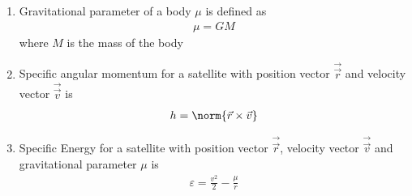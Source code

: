 \begin{enumerate}[label=\thesubsection.\arabic*, ref=\thesubsection.\theenumi]
\begin{align}
r^2 \brak{\vec{r}\brak{\theta}^{\top}\vec{V}\vec{r}\brak{\theta}} + 2r \brak{\vec{u}^{\top}\vec{r}\brak{\theta}} + f = 0
\label{eq:EE26BTECH11202-polar_quad}
\end{align}
Evaluating the inner products:
\begin{align}
\vec{n}^{\top}\vec{r}\brak{\theta} &= \myvec{\cos\theta_0 & \sin\theta_0}\myvec{\cos\theta \\ \sin\theta} = \cos\brak{\theta - \theta_0}
\\
\vec{r}\brak{\theta}^{\top}\vec{V}\vec{r}\brak{\theta} &= \vec{r}\brak{\theta}^{\top}\brak{\vec{I} - e^2\vec{n}\vec{n}^{\top}}\vec{r}\brak{\theta} = 1 - e^2 \cos^2\brak{\theta - \theta_0}
\\
\vec{u}^{\top}\vec{r}\brak{\theta} &= -p e^2 \cos\brak{\theta - \theta_0}
\end{align}
Substituting these into \eqref{eq:EE26BTECH11202-polar_quad}:
\begin{align}
r^2 \sbrak{1 - e^2 \cos^2\brak{\theta - \theta_0}} - 2r p e^2 \cos\brak{\theta - \theta_0} - p^2 e^2 = 0
\end{align}
Factoring the quadratic expression:
\begin{align}
\sbrak{r\brak{1 + e\cos\brak{\theta - \theta_0}} - ep} \sbrak{r\brak{1 - e\cos\brak{\theta - \theta_0}} + ep} = 0
\end{align}
Taking the positive real root for radial distance $r > 0$:
\begin{align}
r\brak{1 + e\cos\brak{\theta - \theta_0}} = ep
\end{align}
yielding \eqref{eq:EE26BTECH11202-polar_conic}
\item Gravitational parameter of a body $\mu$ is defined as
\begin{align}
	\mu=GM
\end{align}
where $M$ is the mass of the body
\item Specific angular momentum for a satellite with position vector $\vec{\vec{r}}$ and velocity vector $\vec{\vec{v}}$ is 
\begin{align}
	h= \norm{\vec{r} \times \vec{v}} \label{eq:EE26BTECH11202-ang-moment}
\end{align}
\item Specific Energy for a satellite with position vector $\vec{\vec{r}}$, velocity vector $\vec{\vec{v}}$ and gravitational parameter $\mu$ is 
\begin{align}
\varepsilon = \frac{v^2}{2} - \frac{\mu}{r} \label{eq:EE26BTECH11202-energy}

\end{align}
\end{enumerate}
